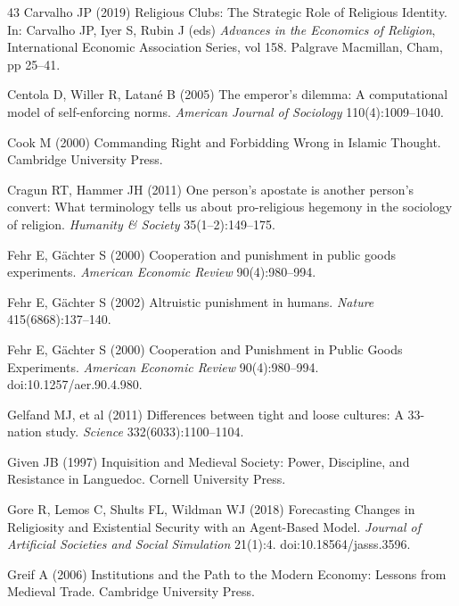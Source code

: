 \documentclass[12pt]{article}
\begin{document}
\begin{thebibliography}{43}
Carvalho JP (2019) Religious Clubs: The Strategic Role of Religious Identity. In: Carvalho JP, Iyer S, Rubin J (eds) \textit{Advances in the Economics of Religion}, International Economic Association Series, vol 158. Palgrave Macmillan, Cham, pp 25--41.

Centola D, Willer R, Latan\'e B (2005) The emperor's dilemma: A computational model of self-enforcing norms. \textit{American Journal of Sociology} 110(4):1009--1040.

Cook M (2000) Commanding Right and Forbidding Wrong in Islamic Thought. Cambridge University Press.

Cragun RT, Hammer JH (2011) One person's apostate is another person's convert: What terminology tells us about pro-religious hegemony in the sociology of religion. \textit{Humanity \& Society} 35(1--2):149--175.

Fehr E, G\"achter S (2000) Cooperation and punishment in public goods experiments. \textit{American Economic Review} 90(4):980--994.

Fehr E, G\"achter S (2002) Altruistic punishment in humans. \textit{Nature} 415(6868):137--140.

Fehr E, G\"{a}chter S (2000) Cooperation and Punishment in Public Goods Experiments. \textit{American Economic Review} 90(4):980--994. doi:10.1257/aer.90.4.980.

Gelfand MJ, et al (2011) Differences between tight and loose cultures: A 33-nation study. \textit{Science} 332(6033):1100--1104.

Given JB (1997) Inquisition and Medieval Society: Power, Discipline, and Resistance in Languedoc. Cornell University Press.

Gore R, Lemos C, Shults FL, Wildman WJ (2018) Forecasting Changes in Religiosity and Existential Security with an Agent-Based Model. \textit{Journal of Artificial Societies and Social Simulation} 21(1):4. doi:10.18564/jasss.3596.

Greif A (2006) Institutions and the Path to the Modern Economy: Lessons from Medieval Trade. Cambridge University Press.


\end{thebibliography}
\end{document}
